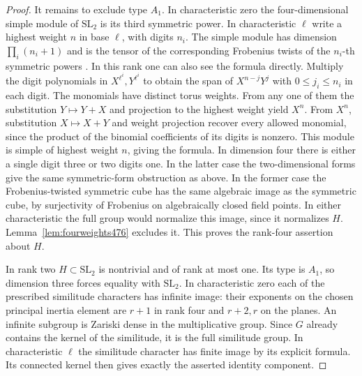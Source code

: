 \documentclass[a4paper,11pt]{article}
\theoremstyle{definition}
\theoremstyle{remark}
\numberwithin{equation}{section}
\begin{document}
\begin{proof}
It remains to exclude type \(A_1\). In characteristic zero the
four-dimensional simple module of \(\mathrm{SL}_2\) is its
third symmetric power. In characteristic \(\ell\) write a
highest weight \(n\) in base \(\ell\), with digits \(n_i\).
The simple module has dimension \(\prod_i(n_i+1)\) and is
the tensor of the corresponding Frobenius twists of the
\(n_i\)-th symmetric powers \cite{IX-VII-steinberg476}. In this rank
one can also see the formula directly. Multiply the digit
polynomials in \(X^{\ell^i},Y^{\ell^i}\) to obtain the span
of \(X^{n-j}Y^j\) with \(0\le j_i\le n_i\) in each digit.
The monomials have distinct torus weights. From any one of them
the substitution \(Y\mapsto Y+X\) and projection to the highest
weight yield \(X^n\). From \(X^n\), substitution \(X\mapsto X+Y\)
and weight projection recover every allowed monomial, since the
product of the binomial coefficients of its digits is nonzero.
This module is simple of highest weight \(n\), giving the formula.
In dimension four there is either a single digit three or two
digits one. In the latter case the two-dimensional forms give the
same symmetric-form obstruction as above. In the former case the
Frobenius-twisted symmetric cube has the same algebraic image as
the symmetric cube, by surjectivity of Frobenius on algebraically
closed field points. In either characteristic the full group
would normalize this image, since it normalizes \(H\).
Lemma~\ref{lem:fourweights476} excludes it. This proves the
rank-four assertion about \(H\).

In rank two \(H\subset\mathrm{SL}_2\) is nontrivial and of rank
at most one. Its type is \(A_1\), so dimension three forces
equality with \(\mathrm{SL}_2\). In characteristic zero each
of the prescribed similitude characters has infinite image:
their exponents on the chosen principal inertia element are
\(r+1\) in rank four and \(r+2,r\) on the planes. An infinite
subgroup is Zariski dense in the multiplicative group. Since
\(G\) already contains the kernel of the similitude, it is the
full similitude group. In characteristic \(\ell\) the similitude
character has finite image by its explicit formula. Its connected
kernel then gives exactly the asserted identity component.
\end{proof}
\end{document}
